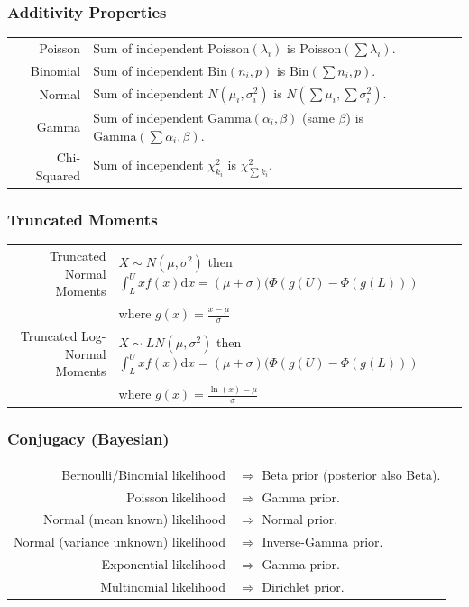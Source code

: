 \documentclass[11pt,a4paper]{article}
\theoremstyle{definition}
\begin{document}
\subsubsection*{Additivity Properties}
\begin{longtable}{r l}
Poisson & Sum of independent $\text{Poisson}(\lambda_i)$ is $\text{Poisson}\!\left(\sum\lambda_i\right)$.\\
Binomial & Sum of independent $\text{Bin}(n_i,p)$ is $\text{Bin}\!\left(\sum n_i, p\right)$.\\
Normal & Sum of independent $N(\mu_i,\sigma_i^2)$ is $N\!\left(\sum\mu_i, \sum\sigma_i^2\right)$.\\
Gamma & Sum of independent $\text{Gamma}(\alpha_i,\beta)$ (same $\beta$) is $\text{Gamma}\!\left(\sum\alpha_i,\beta\right)$.\\
Chi-Squared & Sum of independent $\chi^2_{k_i}$ is $\chi^2_{\sum k_i}$.\\
\end{longtable}

\newpage
\subsubsection*{Truncated Moments}

\begin{longtable}{r l}
Truncated Normal Moments & $X\sim N(\mu,\sigma^2)$ then $\int_L^U x f(x) \text{d}x = (\mu + \sigma)(\Phi(g(U) - \Phi (g(L)))$ \\ & \quad \quad where $g(x) = \frac{x-\mu}{\sigma}$ \vspace{0.1cm}\\
Truncated Log-Normal Moments & $X\sim LN(\mu,\sigma^2)$ then $\int_L^U x f(x) \text{d}x = (\mu + \sigma)(\Phi(g(U) - \Phi (g(L)))$ \\ & \quad \quad where $g(x) = \frac{\ln(x)-\mu}{\sigma}$ \\
\end{longtable}

\subsubsection*{Conjugacy (Bayesian)}
\begin{longtable}{r l}
Bernoulli/Binomial likelihood & $\Rightarrow$ Beta prior (posterior also Beta).\\
Poisson likelihood & $\Rightarrow$ Gamma prior.\\
Normal (mean known) likelihood & $\Rightarrow$ Normal prior.\\
Normal (variance unknown) likelihood & $\Rightarrow$ Inverse-Gamma prior.\\
Exponential likelihood & $\Rightarrow$ Gamma prior.\\
Multinomial likelihood & $\Rightarrow$ Dirichlet prior.\\
\end{longtable}
\end{document}
